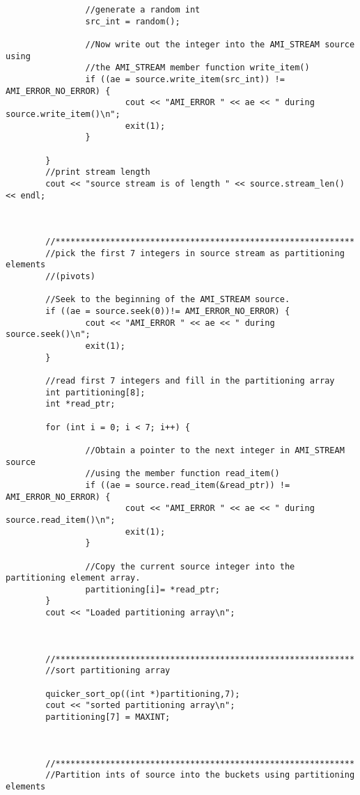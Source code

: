 \begin{verbatim}
                //generate a random int
                src_int = random();
                
                //Now write out the integer into the AMI_STREAM source using 
                //the AMI_STREAM member function write_item()
                if ((ae = source.write_item(src_int)) != AMI_ERROR_NO_ERROR) {
                        cout << "AMI_ERROR " << ae << " during source.write_item()\n";
                        exit(1);
                }
                
        }
        //print stream length
        cout << "source stream is of length " << source.stream_len() << endl;
        
        

        //************************************************************
        //pick the first 7 integers in source stream as partitioning elements
        //(pivots)
        
        //Seek to the beginning of the AMI_STREAM source.
        if ((ae = source.seek(0))!= AMI_ERROR_NO_ERROR) {
                cout << "AMI_ERROR " << ae << " during source.seek()\n";
                exit(1);
        }
        
        //read first 7 integers and fill in the partitioning array
        int partitioning[8];
        int *read_ptr;
        
        for (int i = 0; i < 7; i++) {
                
                //Obtain a pointer to the next integer in AMI_STREAM source
                //using the member function read_item()
                if ((ae = source.read_item(&read_ptr)) != AMI_ERROR_NO_ERROR) {
                        cout << "AMI_ERROR " << ae << " during source.read_item()\n";
                        exit(1);
                }
                
                //Copy the current source integer into the partitioning element array.
                partitioning[i]= *read_ptr;
        }
        cout << "Loaded partitioning array\n";



        //************************************************************
        //sort partitioning array
        
        quicker_sort_op((int *)partitioning,7);
        cout << "sorted partitioning array\n";
        partitioning[7] = MAXINT;



        //************************************************************
        //Partition ints of source into the buckets using partitioning elements
        

\end{verbatim}
